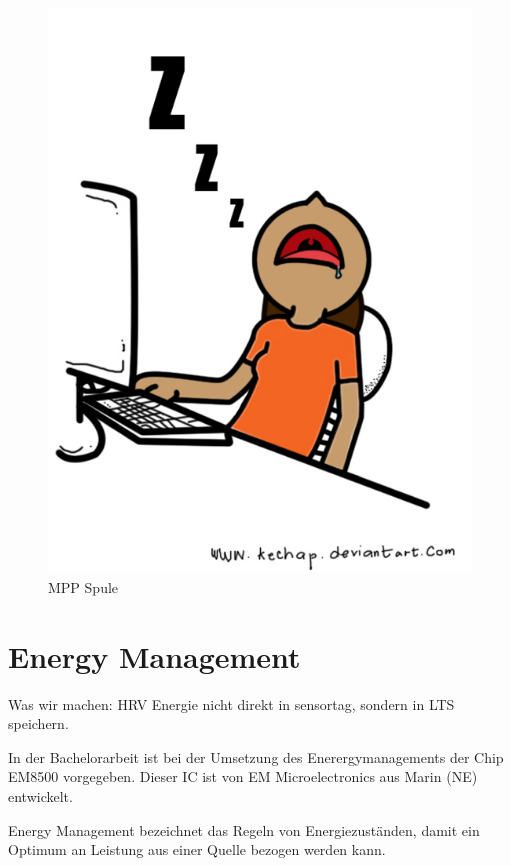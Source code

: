 \begin{figure}
   \includegraphics{Idle.jpg}
   \caption{MPP Spule}\label{mpp_harvester} 
\end{figure}

\cite{MPP_Harv}


\section{Energy Management}\label{t_energy_management} 
Was wir machen: HRV Energie nicht direkt in sensortag, sondern in LTS speichern.

In der Bachelorarbeit ist bei der Umsetzung des Enerergymanagements der Chip EM8500 vorgegeben. Dieser IC ist von EM Microelectronics aus Marin (NE) entwickelt. %


Energy Management bezeichnet das Regeln von Energiezuständen, damit ein Optimum an Leistung aus einer Quelle bezogen werden kann.


